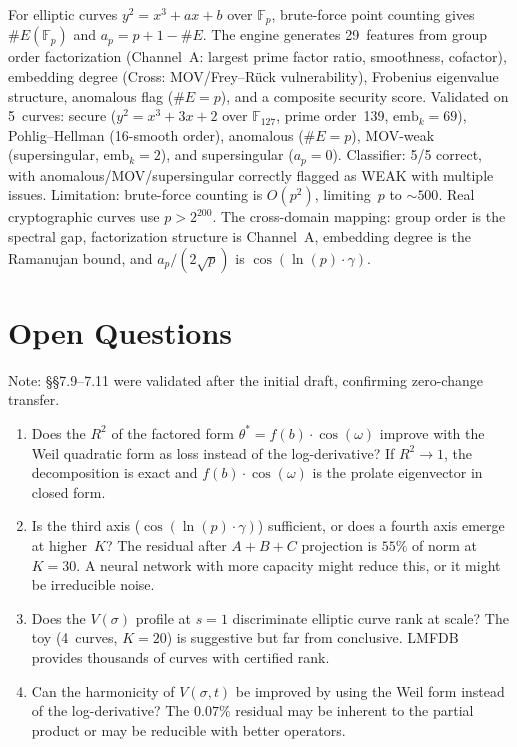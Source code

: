 \documentclass[11pt]{amsart}
\begin{document}
For elliptic curves $y^2 = x^3 + ax + b$ over $\mathbb{F}_p$, brute-force
point counting gives $\#E(\mathbb{F}_p)$ and $a_p = p + 1 - \#E$. The
engine generates 29~features from group order factorization (Channel~A: largest
prime factor ratio, smoothness, cofactor), embedding degree (Cross:
MOV/Frey--R\"uck vulnerability), Frobenius eigenvalue structure, anomalous
flag ($\#E = p$), and a composite security score. Validated on 5~curves:
secure ($y^2 = x^3 + 3x + 2$ over $\mathbb{F}_{127}$, prime order~139,
$\text{emb}_k = 69$), Pohlig--Hellman (16-smooth order), anomalous
($\#E = p$), MOV-weak (supersingular, $\text{emb}_k = 2$), and
supersingular ($a_p = 0$). Classifier: 5/5 correct, with
anomalous/MOV/supersingular correctly flagged as WEAK with multiple issues.
Limitation: brute-force counting is $O(p^2)$, limiting~$p$ to ${\sim}500$.
Real cryptographic curves use $p > 2^{200}$. The cross-domain mapping: group
order is the spectral gap, factorization structure is Channel~A, embedding
degree is the Ramanujan bound, and $a_p/(2\sqrt{p})$ is
$\cos(\ln(p)\cdot\gamma)$.


\section{Open Questions}
\label{sec:open}

Note: \S\S7.9--7.11 were validated after the initial draft, confirming
zero-change transfer.

\begin{enumerate}[label=(\alph*)]
\item Does the $R^2$ of the factored form
  $\theta^* = f(b)\cdot\cos(\omega)$ improve with the Weil quadratic form as
  loss instead of the log-derivative? If $R^2 \to 1$, the decomposition is
  exact and $f(b)\cdot\cos(\omega)$ is the prolate eigenvector in closed
  form.

\item Is the third axis ($\cos(\ln(p)\cdot\gamma)$) sufficient, or does a
  fourth axis emerge at higher~$K$? The residual after $A+B+C$ projection is
  $55\%$ of norm at $K=30$. A neural network with more capacity might reduce
  this, or it might be irreducible noise.

\item Does the $V(\sigma)$ profile at $s = 1$ discriminate elliptic curve
  rank at scale? The toy (4~curves, $K=20$) is suggestive but far from
  conclusive. LMFDB provides thousands of curves with certified rank.

\item Can the harmonicity of $V(\sigma,t)$ be improved by using the Weil
  form instead of the log-derivative? The $0.07\%$ residual may be inherent
  to the partial product or may be reducible with better operators.
\end{enumerate}
\end{document}
